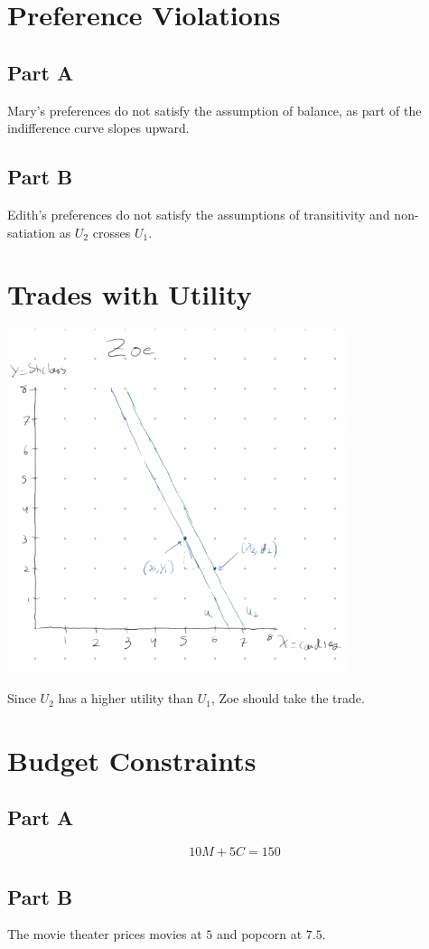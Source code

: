 \documentclass[8pt]{extarticle}
\begin{document}
{\section{Preference Violations}
\subsection*{Part A}
Mary's preferences do not satisfy the assumption of balance, as part of the indifference curve slopes upward.
\subsection*{Part B}
Edith's preferences do not satisfy the assumptions of transitivity and non-satiation as $U_2$ crosses $ U_1 $.
\section{Trades with Utility}
\begin{center}
	\includegraphics[width=10cm]{HW3Q5}
\end{center}
\noindent Since $ U_2 $ has a higher utility than $ U_1 $, Zoe should take the trade.
\section{Budget Constraints}
\subsection*{Part A}
\[ 10M + 5C = 150 \]
\subsection*{Part B}
The movie theater prices movies at $5$ and popcorn at $7.5$.
}
\end{document}
